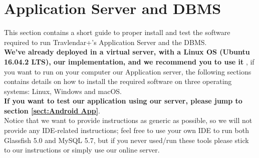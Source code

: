 \section{Application Server and DBMS}
\label{sect:Application Server and DBMS}
This section contains a short guide to proper install and test the software required to run Travlendar+'s Application Server and the DBMS.\\
{\large \textbf{We've already deployed in a virtual server, with a Linux OS (Ubuntu 16.04.2 LTS), our implementation, and we recommend you to use it}} , if you want to run on your computer our Application server, the following sections contains details on how to install the required software on three operating systems: Linux, Windows and macOS.\\
{\large \textbf{If you want to test our application using our server, please jump to section  \ref{sect:Android App}}}.\\
Notice that we want to provide instructions as generic as possible, so we will not provide any IDE-related instructions; feel free to use your own IDE to run both Glassfish 5.0 and MySQL 5.7, but if you never used/run these tools please stick to our instructions or simply use our online server.

